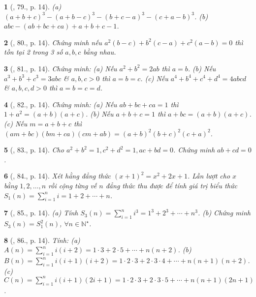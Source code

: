 \documentclass{article}
\newtheorem{baitoan}{}
\begin{document}
\begin{baitoan}[\cite{Binh_Toan_8_tap_1}, 79., p. 14]
	(a) $(a + b + c)^3 - (a + b - c)^3 - (b + c - a)^3 - (c + a - b)^3$. (b) $abc - (ab + bc + ca) + a + b + c - 1$.
\end{baitoan}

\begin{baitoan}[\cite{Binh_Toan_8_tap_1}, 80., p. 14]
	Chứng minh nếu $a^2(b - c) + b^2(c - a) + c^2(a - b) = 0$ thì tồn tại 2 trong 3 số $a,b,c$ bằng nhau.
\end{baitoan}

\begin{baitoan}[\cite{Binh_Toan_8_tap_1}, 81., p. 14]
	Chứng minh: (a) Nếu $a^2 + b^2 = 2ab$ thì $a = b$. (b) Nếu $a^3 + b^3 + c^3 = 3abc$ \& $a,b,c > 0$ thì $a = b = c$. (c) Nếu $a^4 + b^4 + c^4 + d^4 = 4abcd$ \& $a,b,c,d > 0$ thì $a = b = c = d$.
\end{baitoan}

\begin{baitoan}[\cite{Binh_Toan_8_tap_1}, 82., p. 14]
	Chứng minh: (a) Nếu $ab + bc + ca = 1$ thì $1 + a^2 = (a + b)(a + c)$. (b) Nếu $a + b + c = 1$ thì $a + bc = (a + b)(a + c)$. (c) Nếu $m = a + b + c$ thì $(am + bc)(bm + ca)(cm + ab) = (a + b)^2(b + c)^2(c + a)^2$.
\end{baitoan}

\begin{baitoan}[\cite{Binh_Toan_8_tap_1}, 83., p. 14]
	Cho $a^2 + b^2 = 1,c^2 + d^2 = 1,ac + bd = 0$. Chứng minh $ab + cd = 0$.
\end{baitoan}

\begin{baitoan}[\cite{Binh_Toan_8_tap_1}, 84., p. 14]
	Xét hằng đẳng thức $(x + 1)^2 = x^2 + 2x + 1$. Lần lượt cho $x$ bằng $1,2,\ldots,n$ rồi cộng từng vế $n$ đẳng thức thu được để tính giá trị biểu thức $S_1(n) = \sum_{i=1}^n i = 1 + 2 + \cdots + n$.
\end{baitoan}

\begin{baitoan}[\cite{Binh_Toan_8_tap_1}, 85., p. 14]
	(a) Tính $S_3(n) = \sum_{i=1}^n i^3 = 1^3 + 2^3 + \cdots + n^3$. (b) Chứng minh $S_3(n) = S_1^2(n)$, $\forall n\in\mathbb{N}^\star$.
\end{baitoan}

\begin{baitoan}[\cite{Binh_Toan_8_tap_1}, 86., p. 14]
	Tính: (a) $A(n) = \sum_{i=1}^n i(i + 2) = 1\cdot3 + 2\cdot5 + \cdots + n(n + 2)$. (b) $B(n) = \sum_{i=1}^n i(i + 1)(i + 2) = 1\cdot2\cdot3 + 2\cdot3\cdot4 + \cdots + n(n + 1)(n + 2)$. (c) $C(n) = \sum_{i=1}^n i(i + 1)(2i + 1) = 1\cdot2\cdot3 + 2\cdot3\cdot5 + \cdots + n(n + 1)(2n + 1)$.
\end{baitoan}
\end{document}

